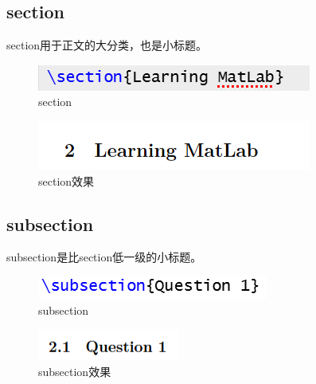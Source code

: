 \documentclass{article}
\begin{document}
\subsection{section}
section用于正文的大分类，也是小标题。
\begin{figure}[H]
    \centering
    \includegraphics[width=1\linewidth]{section1.png}
    \caption{section}
\end{figure}
\begin{figure}[H]
    \centering
    \includegraphics[width=1\linewidth]{section2.png}
    \caption{section效果}
\end{figure}

\subsection{subsection}
subsection是比section低一级的小标题。
\begin{figure}[H]
    \centering
    \includegraphics[width=1\linewidth]{subsection1.png}
    \caption{subsection}
\end{figure}

\begin{figure}[H]
    \centering
    \includegraphics[width=1\linewidth]{subsection2.png}
    \caption{subsection效果}
\end{figure}
\end{document}
